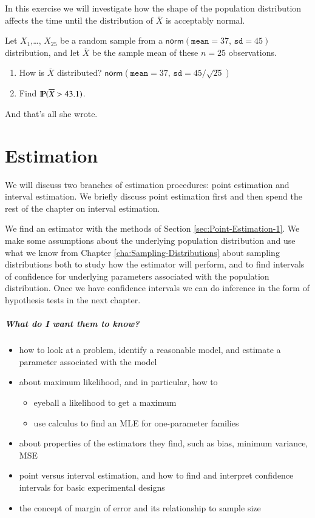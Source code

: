 \documentclass[captions=tableheading]{scrbook}
\begin{document}
\begin{xca}
\label{xca:clt123}
In this exercise we will investigate how the shape of the population distribution affects the time until the distribution of \(\overline{X}\) is acceptably normal.
\end{xca}

\begin{xca}
Let \(X_{1}\),\ldots{}, \(X_{25}\) be a random sample from a \(\mathsf{norm}(\mathtt{mean}=37,\,\mathtt{sd}=45)\) distribution, and let \(\overline{X}\) be the sample mean of these \(n=25\) observations.
\begin{enumerate}
\item How is \(\overline{X}\) distributed? 
   \(\mathsf{norm}(\mathtt{mean}=37,\,\mathtt{sd}=45/\sqrt{25})\)
\item Find \(\P(\overline{X} > 43.1)\).
\end{enumerate}
And that's all she wrote.
\end{xca}
\chapter{Estimation}
\label{sec-9}

\label{cha:Estimation}

\noindent We will discuss two branches of estimation procedures: point estimation and interval estimation. We briefly discuss point estimation first and then spend the rest of the chapter on interval estimation.

We find an estimator with the methods of Section \ref{sec:Point-Estimation-1}. We make some assumptions about the underlying population distribution and use what we know from Chapter \ref{cha:Sampling-Distributions} about sampling distributions both to study how the estimator will perform, and to find intervals of confidence for underlying parameters associated with the population distribution. Once we have confidence intervals we can do inference in the form of hypothesis tests in the next chapter.

\paragraph*{What do I want them to know?}
\begin{itemize}
\item how to look at a problem, identify a reasonable model, and estimate a parameter associated with the model
\item about maximum likelihood, and in particular, how to
\begin{itemize}
\item eyeball a likelihood to get a maximum
\item use calculus to find an MLE for one-parameter families
\end{itemize}
\item about properties of the estimators they find, such as bias, minimum variance, MSE
\item point versus interval estimation, and how to find and interpret confidence intervals for basic experimental designs
\item the concept of margin of error and its relationship to sample size
\end{itemize}
\end{document}
